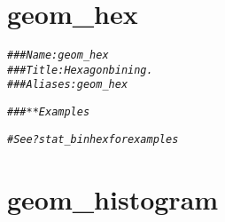\documentclass[a4paper,titlepage]{tufte-handout}\usepackage[]{graphicx}\usepackage[]{color}
\makeatletter
\newcommand{\hlcom}[1]{\textcolor[rgb]{0.678,0.584,0.686}{\textit{#1}}}%
\newenvironment{kframe}{%
 \def\at@end@of@kframe{}%
 \ifinner\ifhmode%
  \def\at@end@of@kframe{\end{minipage}}%
  \begin{minipage}{\columnwidth}%
 \fi\fi%
 \def\FrameCommand##1{\hskip\@totalleftmargin \hskip-\fboxsep
 \colorbox{shadecolor}{##1}\hskip-\fboxsep
     \hskip-\linewidth \hskip-\@totalleftmargin \hskip\columnwidth}%
 \MakeFramed {\advance\hsize-\width
   \@totalleftmargin\z@ \linewidth\hsize
   \@setminipage}}%
 {\par\unskip\endMakeFramed%
 \at@end@of@kframe}
\newenvironment{knitrout}{}{} %
\makeatother
\begin{document}
\section{geom\_hex}

\begin{knitrout}
\color{fgcolor}\begin{kframe}
\begin{alltt}
\hlcom{### Name: geom_hex}
\hlcom{### Title: Hexagon bining.}
\hlcom{### Aliases: geom_hex}

\hlcom{### ** Examples}

\hlcom{# See ?stat_binhex for examples}
\end{alltt}
\end{kframe}
\end{knitrout}



\section{geom\_histogram}
\end{document}
